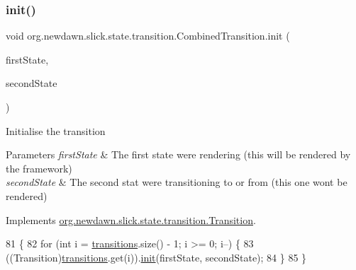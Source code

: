\subsubsection{\texorpdfstring{init()}{init()}}
{\footnotesize\ttfamily void org.\+newdawn.\+slick.\+state.\+transition.\+Combined\+Transition.\+init (\begin{DoxyParamCaption}\item[{\mbox{\hyperlink{interfaceorg_1_1newdawn_1_1slick_1_1state_1_1_game_state}{Game\+State}}}]{first\+State,  }\item[{\mbox{\hyperlink{interfaceorg_1_1newdawn_1_1slick_1_1state_1_1_game_state}{Game\+State}}}]{second\+State }\end{DoxyParamCaption})\hspace{0.3cm}{\ttfamily [inline]}}

Initialise the transition


\begin{DoxyParams}{Parameters}
{\em first\+State} & The first state we\textquotesingle{}re rendering (this will be rendered by the framework) \\
\hline
{\em second\+State} & The second stat we\textquotesingle{}re transitioning to or from (this one won\textquotesingle{}t be rendered) \\
\hline
\end{DoxyParams}


Implements \mbox{\hyperlink{interfaceorg_1_1newdawn_1_1slick_1_1state_1_1transition_1_1_transition_a7b59f0c9205f1f0417ee18bc526e5b01}{org.\+newdawn.\+slick.\+state.\+transition.\+Transition}}.


\begin{DoxyCode}
81                                                                   \{
82        \textcolor{keywordflow}{for} (\textcolor{keywordtype}{int} i = \mbox{\hyperlink{classorg_1_1newdawn_1_1slick_1_1state_1_1transition_1_1_combined_transition_a4fea111ea283a26351cb164e389ebbbf}{transitions}}.size() - 1; i >= 0; i--) \{
83           ((Transition)\mbox{\hyperlink{classorg_1_1newdawn_1_1slick_1_1state_1_1transition_1_1_combined_transition_a4fea111ea283a26351cb164e389ebbbf}{transitions}}.get(i)).\mbox{\hyperlink{classorg_1_1newdawn_1_1slick_1_1state_1_1transition_1_1_combined_transition_add47b8016bc87384ec197ba6923d1438}{init}}(firstState, secondState);
84        \}
85     \}
\end{DoxyCode}
\mbox{\label{classorg_1_1newdawn_1_1slick_1_1state_1_1transition_1_1_combined_transition_a8c5e343409337ff699285e29ca8ec457}} 
